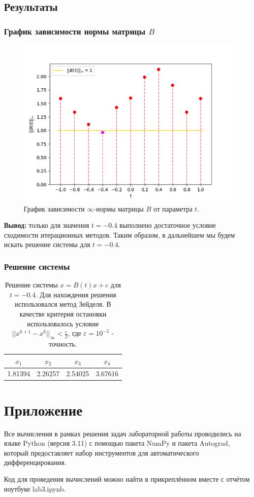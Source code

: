 \documentclass[12pt]{article}%
\begin{document}
\subsection{Результаты}
\subsubsection{График зависимости нормы матрицы $B$}
\begin{figure}[h]
    \centering
    \includegraphics[width=0.9\linewidth]{matrix_norm.png}
    \caption{График зависимости $\infty$-нормы матрицы $B$ от параметра $t$.}
\end{figure}

\newpage
\textbf{Вывод:} только для значения $t = -0.4$ выполнено достаточное условие сходимости итерационных методов. Таким образом, в дальнейшем мы будем искать решение системы для $t = -0.4$. 

\subsubsection{Решение системы}
\begin{table}[h]
    \centering
    \begin{tabular}{|c|c|c|c|}
    \hline $x_1$ & $x_2$ & $x_3$ & $x_4$ \\
    \hline 1.81394 & 2.26257 & 2.54025 & 3.67616 \\
    \hline
    \end{tabular}
    \caption{Решение системы $x = B(t) x + c$ для $t=-0.4$. Для нахождения решения использовался метод Зейделя. В качестве критерия остановки использовалось условие $||x^{k+1} - x^{k}||_{\infty} < \frac{\varepsilon}{2}$, где $\varepsilon = 10^{-5}$ - точность.}
\end{table}

\section{Приложение}
Все вычисления в рамках решения задач лабораторной работы проводились на языке Python (версия 3.11) с помощью пакета NumPy и пакета Autograd, который предоставляет набор инструментов для автоматического дифференцирования.

Код для проведения вычислений можно найти в прикреплённом вместе с отчётом ноутбуке lab3.ipynb.
\end{document}
